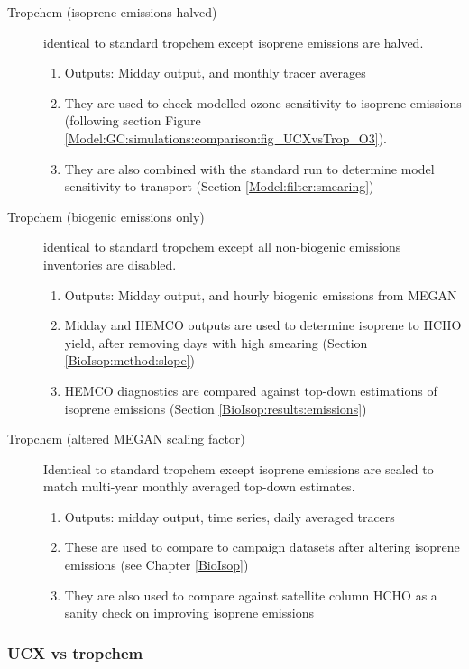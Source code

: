 \begin{description}
    \item [Tropchem (isoprene emissions halved)]%
    identical to standard tropchem except isoprene emissions are halved.
    \begin{enumerate}
      \item Outputs: Midday output, and monthly tracer averages 
      \item They are used to check modelled ozone sensitivity to isoprene emissions (following section Figure \ref{Model:GC:simulations:comparison:fig_UCXvsTrop_O3}).
      \item They are also combined with the standard run to determine model sensitivity to transport (Section \ref{Model:filter:smearing})
    \end{enumerate}
    
    \item [Tropchem (biogenic emissions only)]%
    identical to standard tropchem except all non-biogenic emissions inventories are disabled.
    \begin{enumerate}
      \item Outputs: Midday output, and hourly biogenic emissions from MEGAN
      \item Midday and HEMCO outputs are used to determine isoprene to HCHO yield, after removing days with high smearing (Section \ref{BioIsop:method:slope})
      \item HEMCO diagnostics are compared against top-down estimations of isoprene emissions (Section \ref{BioIsop:results:emissions})
    \end{enumerate}
    
    \item [Tropchem (altered MEGAN scaling factor)]%
    Identical to standard tropchem except isoprene emissions are scaled to match multi-year monthly averaged top-down estimates.
    \begin{enumerate}
      \item Outputs: midday output, time series, daily averaged tracers
      \item These are used to compare to campaign datasets after altering isoprene emissions (see Chapter \ref{BioIsop})
      \item They are also used to compare against satellite column HCHO as a sanity check on improving isoprene emissions
    \end{enumerate}
  \end{description}

\subsubsection{UCX vs tropchem}
\label{Model:GC:simulations:comparison}

